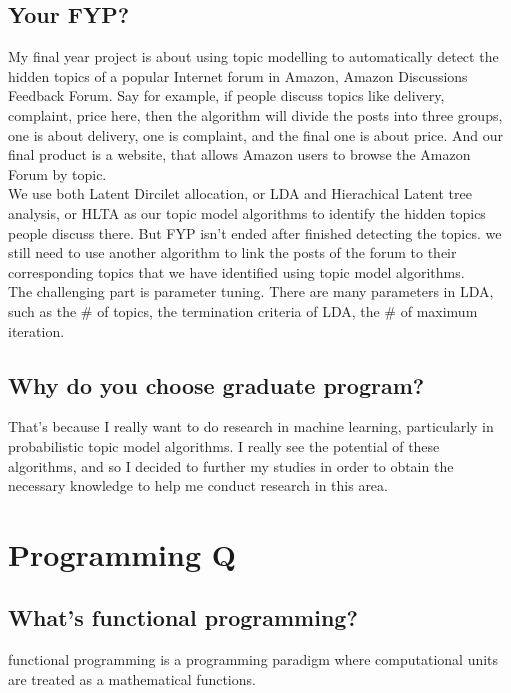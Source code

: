 \documentclass[12pt, landscape]{article}
\begin{document}
\begin{multicols}{2}
\subsection{ Your FYP?}
My final year project is about using topic modelling to automatically detect the hidden topics of a popular Internet forum in Amazon, Amazon Discussions Feedback Forum. Say for example, if people discuss topics like delivery, complaint, price here, then the algorithm will divide the posts into three groups, one is about delivery, one is complaint, and the final one is about price. And our final product is a website, that allows Amazon users to browse the Amazon Forum by topic. \\

We use both Latent Dircilet allocation, or LDA and Hierachical Latent tree analysis, or HLTA as our topic model algorithms to identify the hidden topics people discuss there. But FYP isn't ended after finished detecting the topics. we still need to use another algorithm to link the posts of the forum to their corresponding topics that we have identified using topic model algorithms. \\

The challenging part is parameter tuning. There are many parameters in LDA, such as the \# of topics, the termination criteria of LDA, the \# of maximum iteration.  

\subsection{Why do you choose graduate program?}
That's because I really want to do research in machine learning, particularly in probabilistic topic model algorithms. I really see the potential of these algorithms, and so I decided to further my studies in order to obtain the necessary knowledge to help me conduct research in this area. 



\section{Programming Q}
\subsection{What's functional programming?}
functional programming is a programming paradigm where computational units are treated as a mathematical functions.


\end{multicols}
\end{document}
